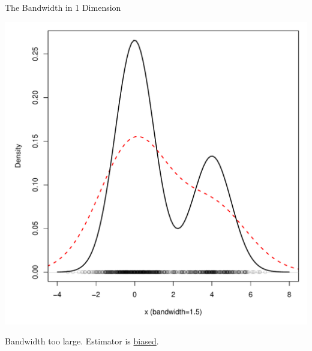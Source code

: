 \documentclass[12pt]{beamer}
\begin{document}
\begin{frame}{The Bandwidth in 1 Dimension}


  \begin{center}
    \includegraphics[scale=0.4]{figs/density3_1.pdf}
    \end{center}

\vspace{-.2in}

\begin{center}
  Bandwidth too large. Estimator is \underline{biased}.
\end{center}

  
\end{frame}
\end{document}
